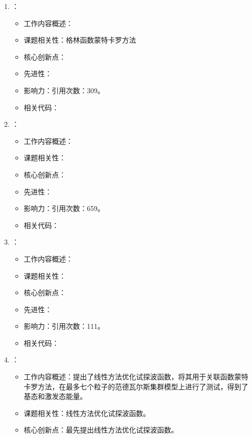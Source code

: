 \begin{enumerate}
\begin{itemize}
            \end{itemize}
        \item \citet{trivedi1990ground}：
            \begin{itemize}
                \item 工作内容概述：
                \item 课题相关性：格林函数蒙特卡罗方法
                \item 核心创新点：
                \item 先进性：
                \item 影响力：引用次数：309。
                \item 相关代码：
            \end{itemize}
        \item \citet{umrigar1993diffusion}：
            \begin{itemize}
                \item 工作内容概述：
                \item 课题相关性：
                \item 核心创新点：
                \item 先进性：
                \item 影响力：引用次数：659。
                \item 相关代码：
            \end{itemize}
            \item \citet{sorella2000green}：
            \begin{itemize}
                \item 工作内容概述：
                \item 课题相关性：
                \item 核心创新点：
                \item 先进性：
                \item 影响力：引用次数：111。
                \item 相关代码：
            \end{itemize}
        \item \citet{nightingale2001optimization}：
        \begin{itemize}
            \item 工作内容概述：提出了线性方法优化试探波函数，将其用于关联函数蒙特卡罗方法，在最多七个粒子的范德瓦尔斯集群模型上进行了测试，得到了基态和激发态能量。
            \item 课题相关性：线性方法优化试探波函数。
            \item 核心创新点：最先提出线性方法优化试探波函数。

\end{itemize}
\end{enumerate}
